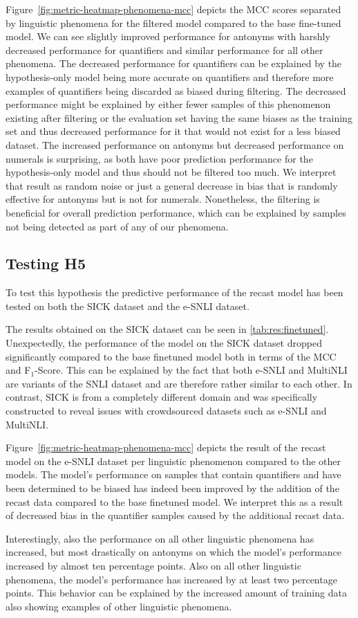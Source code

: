 Figure~\ref{fig:metric-heatmap-phenomena-mcc} depicts the \ac{MCC} scores separated by linguistic phenomena for the filtered model compared to the base fine-tuned model. We can see slightly improved performance for antonyms with harshly decreased performance for quantifiers and similar performance for all other phenomena. The decreased performance for quantifiers can be explained by the hypothesis-only model being more accurate on quantifiers and therefore more examples of quantifiers being discarded as biased during filtering. The decreased performance might be explained by either fewer samples of this phenomenon existing after filtering or the evaluation set having the same biases as the training set and thus decreased performance for it that would not exist for a less biased dataset. The increased performance on antonyms but decreased performance on numerals is surprising, as both have poor prediction performance for the hypothesis-only model and thus should not be filtered too much. We interpret that result as random noise or just a general decrease in bias that is randomly effective for antonyms but is not for numerals. Nonetheless, the filtering is beneficial for overall prediction performance, which can be explained by samples not being detected as part of any of our phenomena.


\subsection{Testing H5}
To test this hypothesis the predictive performance of the recast model has been tested on both the \ac{SICK} dataset and the \ac{e-SNLI} dataset.

The results obtained on the \ac{SICK} dataset can be seen in \autoref{tab:res:finetuned}. Unexpectedly, the performance of the model on the \ac{SICK} dataset dropped significantly compared to the base finetuned model both in terms of the \ac{MCC} and F$_1$-Score. This can be explained by the fact that both \ac{e-SNLI} and \ac{MultiNLI} are variants of the \ac{SNLI} dataset and are therefore rather similar to each other. In contrast, \ac{SICK} is from a completely different domain and was specifically constructed to reveal issues with crowdsourced datasets such as \ac{e-SNLI} and \ac{MultiNLI}.

Figure~\ref{fig:metric-heatmap-phenomena-mcc} depicts the result of the recast model on the \ac{e-SNLI} dataset per linguistic phenomenon compared to the other models. The model's performance on samples that contain quantifiers and have been determined to be biased has indeed been improved by the addition of the recast data compared to the base finetuned model. We interpret this as a result of decreased bias in the quantifier samples caused by the additional recast data.

Interestingly, also the performance on all other linguistic phenomena has increased, but most drastically on antonyms on which the model's performance increased by almost ten percentage points. Also on all other linguistic phenomena, the model's performance has increased by at least two percentage points. This behavior can be explained by the increased amount of training data also showing examples of other linguistic phenomena.
